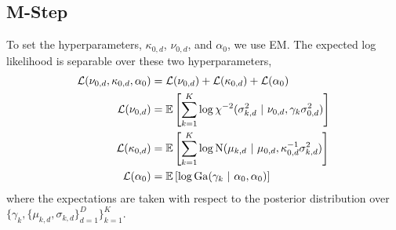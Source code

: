 \subsection{M-Step}
To set the hyperparameters, $\kappa_{0,d}$, $\nu_{0,d}$, and $\alpha_0$, we use EM. The expected log likelihood is separable over these two hyperparameters,
\begin{align*}
    \mathcal{L}(\nu_{0,d}, \kappa_{0,d}, \alpha_0) &= \mathcal{L}(\nu_{0,d}) + \mathcal{L}(\kappa_{0,d}) + \mathcal{L}(\alpha_0) \\
    \mathcal{L}(\nu_{0,d})
    &= \mathbb{E}\left[\sum_{k=1}^K \log \chi^{-2}(\sigma_{k,d}^2 ~\vert~ \nu_{0,d}, \gamma_k \sigma_{0,d}^2) \right] \\
    \mathcal{L}(\kappa_{0,d})
    &= \mathbb{E} \left[ \sum_{k=1}^K \log \mathrm{N}(\mu_{k,d} ~\vert~ \mu_{0,d}, \kappa_{0,d}^{-1} \sigma_{k,d}^2) \right] \\
    \mathcal{L}(\alpha_0)
    &= \mathbb{E} \left[ \log \mathrm{Ga}(\gamma_k ~\vert~ \alpha_0, \alpha_0) \right]
\end{align*}
where the expectations are taken with respect to the posterior distribution over $\{\gamma_k, \{\mu_{k,d}, \sigma_{k,d}\}_{d=1}^D \}_{k=1}^K$.

